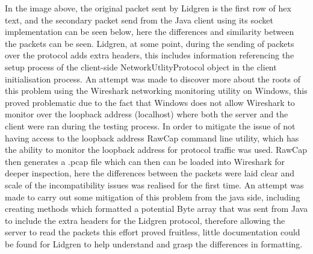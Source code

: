 \documentclass{article}
\begin{document}
In the image above, the original packet sent by Lidgren is the first row of hex text, and the secondary packet send from the Java client using its socket implementation can be seen below, here the differences and similarity between the packets can be seen. Lidgren, at some point, during the sending of packets over the protocol adds extra headers, this includes information referencing the setup process of the client-side NetworkUtlityProtocol object in the client initialisation process. An attempt was made to discover more about the roots of this problem using the Wireshark networking monitoring utility on Windows, this proved problematic due to the fact that Windows does not allow Wireshark to monitor over the loopback address (localhost) where both the server and the client were ran during the testing process. In order to mitigate the issue of not having access to the loopback address RawCap command line utility, which has the ability to monitor the loopback address for protocol traffic was used. RawCap then generates a .pcap file which can then can be loaded into Wireshark for deeper inspection, here the differences between the packets were laid clear and scale of the incompatibility issues was realised for the first time. An attempt was made to carry out some mitigation of this problem from the java side, including creating methods which formatted a potential Byte array that was sent from Java to include the extra headers for the Lidgren protocol, therefore allowing the server to read the packets this effort proved fruitless, little documentation could be found for Lidgren to help understand and grasp the differences in formatting.
\end{document}
